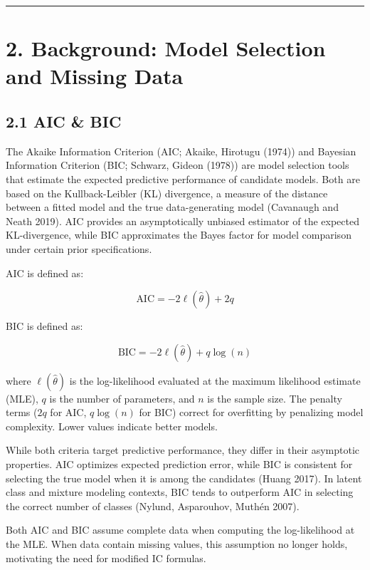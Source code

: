 \documentclass[
]{article}
\begin{document}
\begin{center}\rule{0.5\linewidth}{0.5pt}\end{center}

\section{2. Background: Model Selection and Missing
Data}\label{sec-background}

\subsection{2.1 AIC \& BIC}\label{aic-bic}

The Akaike Information Criterion (AIC; Akaike, Hirotugu (1974)) and
Bayesian Information Criterion (BIC; Schwarz, Gideon (1978)) are model
selection tools that estimate the expected predictive performance of
candidate models. Both are based on the Kullback-Leibler (KL)
divergence, a measure of the distance between a fitted model and the
true data-generating model (Cavanaugh and Neath 2019). AIC provides an
asymptotically unbiased estimator of the expected KL-divergence, while
BIC approximates the Bayes factor for model comparison under certain
prior specifications.

AIC is defined as:

\[\text{AIC} = -2\ell(\hat{\theta}) + 2q\]

BIC is defined as:

\[\text{BIC} = -2\ell(\hat{\theta}) + q\log(n)\]

where \(\ell(\hat{\theta})\) is the log-likelihood evaluated at the
maximum likelihood estimate (MLE), \(q\) is the number of parameters,
and \(n\) is the sample size. The penalty terms (\(2q\) for AIC,
\(q\log(n)\) for BIC) correct for overfitting by penalizing model
complexity. Lower values indicate better models.

While both criteria target predictive performance, they differ in their
asymptotic properties. AIC optimizes expected prediction error, while
BIC is consistent for selecting the true model when it is among the
candidates (Huang 2017). In latent class and mixture modeling contexts,
BIC tends to outperform AIC in selecting the correct number of classes
(Nylund, Asparouhov, Muthén 2007).

Both AIC and BIC assume complete data when computing the log-likelihood
at the MLE. When data contain missing values, this assumption no longer
holds, motivating the need for modified IC formulas.
\end{document}
